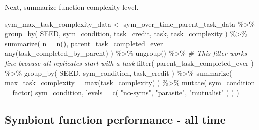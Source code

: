 \documentclass[
]{book}
\newenvironment{Shaded}{\begin{snugshade}}{\end{snugshade}}
\newcommand{\AttributeTok}[1]{\textcolor[rgb]{0.77,0.63,0.00}{#1}}
\newcommand{\CommentTok}[1]{\textcolor[rgb]{0.56,0.35,0.01}{\textit{#1}}}
\newcommand{\FunctionTok}[1]{\textcolor[rgb]{0.00,0.00,0.00}{#1}}
\newcommand{\NormalTok}[1]{#1}
\newcommand{\OtherTok}[1]{\textcolor[rgb]{0.56,0.35,0.01}{#1}}
\newcommand{\SpecialCharTok}[1]{\textcolor[rgb]{0.00,0.00,0.00}{#1}}
\newcommand{\StringTok}[1]{\textcolor[rgb]{0.31,0.60,0.02}{#1}}
\begin{document}
Next, summarize function complexity level.

\begin{Shaded}
\begin{Highlighting}[]
\NormalTok{sym\_max\_task\_complexity\_data }\OtherTok{\textless{}{-}}\NormalTok{ sym\_over\_time\_parent\_task\_data }\SpecialCharTok{\%\textgreater{}\%}
  \FunctionTok{group\_by}\NormalTok{(}
\NormalTok{    SEED,}
\NormalTok{    sym\_condition,}
\NormalTok{    task\_credit,}
\NormalTok{    task,}
\NormalTok{    task\_complexity}
\NormalTok{  ) }\SpecialCharTok{\%\textgreater{}\%}
  \FunctionTok{summarize}\NormalTok{(}
    \AttributeTok{n =} \FunctionTok{n}\NormalTok{(),}
    \AttributeTok{parent\_task\_completed\_ever =} \FunctionTok{any}\NormalTok{(task\_completed\_by\_parent)}
\NormalTok{  ) }\SpecialCharTok{\%\textgreater{}\%}
  \FunctionTok{ungroup}\NormalTok{() }\SpecialCharTok{\%\textgreater{}\%}
  \CommentTok{\# This filter works fine because all replicates start with a task}
  \FunctionTok{filter}\NormalTok{(}
\NormalTok{    parent\_task\_completed\_ever}
\NormalTok{  ) }\SpecialCharTok{\%\textgreater{}\%}
  \FunctionTok{group\_by}\NormalTok{(}
\NormalTok{    SEED,}
\NormalTok{    sym\_condition,}
\NormalTok{    task\_credit}
\NormalTok{  ) }\SpecialCharTok{\%\textgreater{}\%}
  \FunctionTok{summarize}\NormalTok{(}
    \AttributeTok{max\_task\_complexity =} \FunctionTok{max}\NormalTok{(task\_complexity)}
\NormalTok{  ) }\SpecialCharTok{\%\textgreater{}\%}
  \FunctionTok{mutate}\NormalTok{(}
    \AttributeTok{sym\_condition =} \FunctionTok{factor}\NormalTok{(}
\NormalTok{      sym\_condition,}
      \AttributeTok{levels =} \FunctionTok{c}\NormalTok{(}
        \StringTok{"no{-}syms"}\NormalTok{,}
        \StringTok{"parasite"}\NormalTok{,}
        \StringTok{"mutualist"}
\NormalTok{      )}
\NormalTok{    )}
\NormalTok{  )}
\end{Highlighting}
\end{Shaded}

\hypertarget{symbiont-function-performance---all-time-5}{%
\subsection{Symbiont function performance - all time}\label{symbiont-function-performance---all-time-5}}
\end{document}
